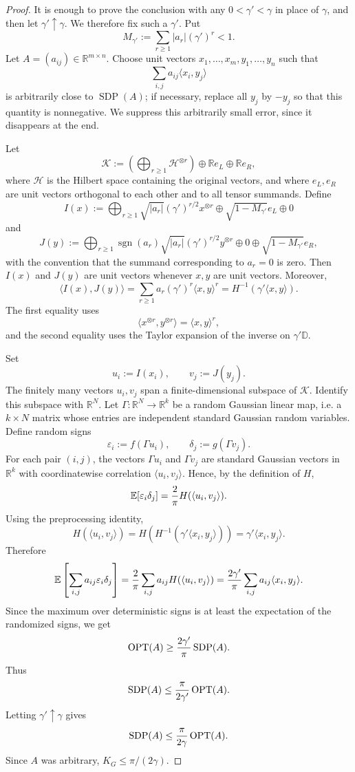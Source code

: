 \documentclass[11pt]{article}
\newcommand{\R}{\mathbb R}
\newcommand{\D}{\mathbb D}
\newcommand{\E}{\mathbb E}
\newcommand{\1}{\mathbf 1}
\newcommand{\sgn}{\operatorname{sgn}}
\newcommand{\ip}[2]{\langle #1,#2\rangle}
\newcommand{\KG}{K_G}
\newcommand{\SDP}{\operatorname{SDP}}
\newcommand{\OPT}{\operatorname{OPT}}
\newcommand{\eps}{\varepsilon}
\newcommand{\calH}{\mathcal H}
\newcommand{\calK}{\mathcal K}
\theoremstyle{plain}
\theoremstyle{definition}
\theoremstyle{remark}
\begin{document}
\begin{proof}
It is enough to prove the conclusion with any $0<\gamma'<\gamma$ in place of $\gamma$, and then let $\gamma'\uparrow\gamma$.  We therefore fix such a $\gamma'$.  Put
\[
  M_{\gamma'}:=\sum_{r\ge1}|a_r|(\gamma')^r<1.
\]
Let $A=(a_{ij})\in\R^{m\times n}$.  Choose unit vectors $x_1,\ldots,x_m,y_1,\ldots,y_n$ such that
\[
  \sum_{i,j}a_{ij}\ip{x_i}{y_j}
\]
is arbitrarily close to $\SDP(A)$; if necessary, replace all $y_j$ by $-y_j$ so that this quantity is nonnegative.  We suppress this arbitrarily small error, since it disappears at the end.

Let
\[
  \calK:=\left(\bigoplus_{r\ge1}\calH^{\otimes r}\right)\oplus \R e_L\oplus \R e_R,
\]
where $\calH$ is the Hilbert space containing the original vectors, and where $e_L,e_R$ are unit vectors orthogonal to each other and to all tensor summands.  Define
\[
  I(x):=\bigoplus_{r\ge1}\sqrt{|a_r|}(\gamma')^{r/2}x^{\otimes r}
  \oplus \sqrt{1-M_{\gamma'}}e_L\oplus0
\]
and
\[
  J(y):=\bigoplus_{r\ge1}\sgn(a_r)\sqrt{|a_r|}(\gamma')^{r/2}y^{\otimes r}
  \oplus0\oplus \sqrt{1-M_{\gamma'}}e_R,
\]
with the convention that the summand corresponding to $a_r=0$ is zero.  Then $I(x)$ and $J(y)$ are unit vectors whenever $x,y$ are unit vectors.  Moreover,
\[
  \ip{I(x)}{J(y)}=\sum_{r\ge1}a_r(\gamma')^r\ip{x}{y}^r
  =H^{-1}(\gamma'\ip{x}{y}).
\]
The first equality uses
\[
  \ip{x^{\otimes r}}{y^{\otimes r}}=\ip{x}{y}^r,
\]
and the second equality uses the Taylor expansion of the inverse on $\gamma'\D$.

Set
\[
  u_i:=I(x_i),\qquad v_j:=J(y_j).
\]
The finitely many vectors $u_i,v_j$ span a finite-dimensional subspace of $\calK$.  Identify this subspace with $\R^N$.  Let $\Gamma:\R^N\to\R^k$ be a random Gaussian linear map, i.e. a $k\times N$ matrix whose entries are independent standard Gaussian random variables.  Define random signs
\[
  \eps_i:=f(\Gamma u_i),\qquad \delta_j:=g(\Gamma v_j).
\]
For each pair $(i,j)$, the vectors $\Gamma u_i$ and $\Gamma v_j$ are standard Gaussian vectors in $\R^k$ with coordinatewise correlation $\ip{u_i}{v_j}$.  Hence, by the definition of $H$,
\[
  \E[\eps_i\delta_j]={2\over\pi}H(\ip{u_i}{v_j}).
\]
Using the preprocessing identity,
\[
  H(\ip{u_i}{v_j})=H\left(H^{-1}(\gamma'\ip{x_i}{y_j})\right)=\gamma'\ip{x_i}{y_j}.
\]
Therefore
\[
  \E\left[\sum_{i,j}a_{ij}\eps_i\delta_j\right]
  ={2\over\pi}\sum_{i,j}a_{ij}H(\ip{u_i}{v_j})
  ={2\gamma'\over\pi}\sum_{i,j}a_{ij}\ip{x_i}{y_j}.
\]
Since the maximum over deterministic signs is at least the expectation of the randomized signs, we get
\[
  \OPT(A)\ge {2\gamma'\over\pi}\SDP(A).
\]
Thus
\[
  \SDP(A)\le {\pi\over2\gamma'}\OPT(A).
\]
Letting $\gamma'\uparrow\gamma$ gives
\[
  \SDP(A)\le {\pi\over2\gamma}\OPT(A).
\]
Since $A$ was arbitrary, $\KG\le \pi/(2\gamma)$.
\end{proof}
\end{document}

